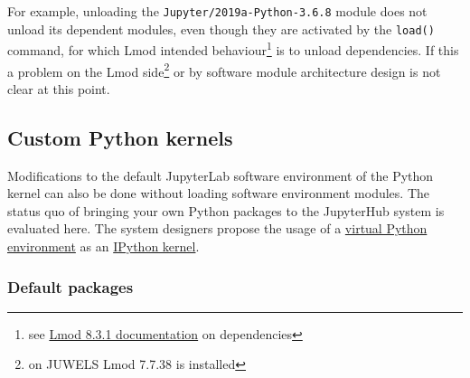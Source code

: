 For example, unloading the \verb|Jupyter/2019a-Python-3.6.8| module does not unload its dependent modules, even though they are activated by the \verb|load()| command, for which Lmod intended behaviour\footnote{see \href{https://lmod.readthedocs.io/en/latest/098_dependent_modules.html}{Lmod 8.3.1 documentation} on dependencies} is to unload dependencies.
If this a problem on the Lmod side\footnote{on JUWELS Lmod 7.7.38 is installed} or by software module architecture design is not clear at this point.


\subsection{Custom Python kernels}
\label{sect:custom-kernels}

Modifications to the default JupyterLab software environment of the Python kernel can also be done without loading software environment modules.
The status quo of bringing your own Python packages to the JupyterHub system is evaluated here.
The system designers propose the usage of a \href{https://docs.python.org/3/library/venv.html}{virtual Python environment} as an \href{https://ipython.org/ipython-doc/3/development/kernels.html#kernelspecs}{IPython kernel}.

\subsubsection{Default packages}
\label{sect:python-kernel:default-packages}

